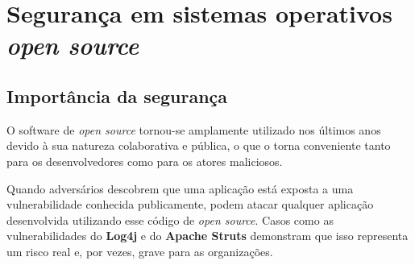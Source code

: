 \section{Segurança em sistemas operativos \textit{open source}} \label{section: segurança}
\subsection{Importância da segurança}
O software de \textit{open source} tornou-se amplamente utilizado nos últimos anos devido à sua natureza colaborativa e pública, o que o torna conveniente tanto para os desenvolvedores como para os atores maliciosos. 
\par \vspace{6pt}
Quando adversários descobrem que uma aplicação está exposta a uma vulnerabilidade conhecida publicamente, podem atacar qualquer aplicação desenvolvida utilizando esse código de \textit{open source}. Casos como as vulnerabilidades do \textbf{Log4j} e do \textbf{Apache Struts} demonstram que isso representa um risco real e, por vezes, grave para as organizações. \cite{openSourceSecurity}
